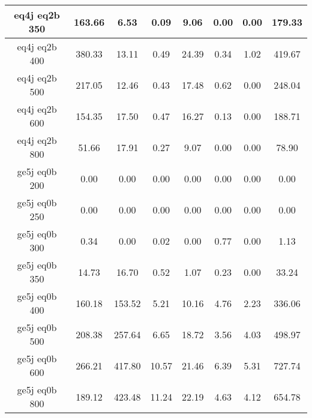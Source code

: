 \begin{longtable}{| c | c | c | c | c | c | c | c  | }
eq4j eq2b 350 & 163.66 & 6.53 & 0.09 & 9.06 & 0.00 & 0.00 & 179.33\\ \hline 
eq4j eq2b 400 & 380.33 & 13.11 & 0.49 & 24.39 & 0.34 & 1.02 & 419.67\\ \hline 
eq4j eq2b 500 & 217.05 & 12.46 & 0.43 & 17.48 & 0.62 & 0.00 & 248.04\\ \hline 
eq4j eq2b 600 & 154.35 & 17.50 & 0.47 & 16.27 & 0.13 & 0.00 & 188.71\\ \hline 
eq4j eq2b 800 & 51.66 & 17.91 & 0.27 & 9.07 & 0.00 & 0.00 & 78.90\\ \hline 
ge5j eq0b 200 & 0.00 & 0.00 & 0.00 & 0.00 & 0.00 & 0.00 & 0.00\\ \hline 
ge5j eq0b 250 & 0.00 & 0.00 & 0.00 & 0.00 & 0.00 & 0.00 & 0.00\\ \hline 
ge5j eq0b 300 & 0.34 & 0.00 & 0.02 & 0.00 & 0.77 & 0.00 & 1.13\\ \hline 
ge5j eq0b 350 & 14.73 & 16.70 & 0.52 & 1.07 & 0.23 & 0.00 & 33.24\\ \hline 
ge5j eq0b 400 & 160.18 & 153.52 & 5.21 & 10.16 & 4.76 & 2.23 & 336.06\\ \hline 
ge5j eq0b 500 & 208.38 & 257.64 & 6.65 & 18.72 & 3.56 & 4.03 & 498.97\\ \hline 
ge5j eq0b 600 & 266.21 & 417.80 & 10.57 & 21.46 & 6.39 & 5.31 & 727.74\\ \hline 
ge5j eq0b 800 & 189.12 & 423.48 & 11.24 & 22.19 & 4.63 & 4.12 & 654.78\\ \hline 
    \hline 
    \hline 
\end{longtable}
